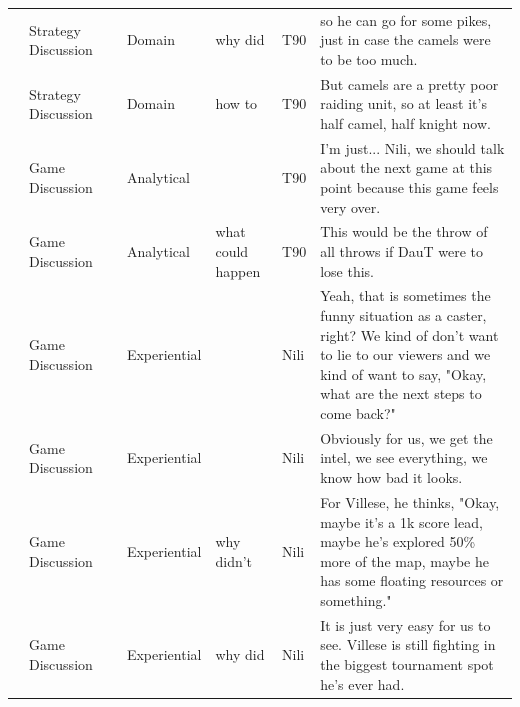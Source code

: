 {\begin{longtable}{@{}>{\theAppRow}r|L{2.3cm}L{2.2cm}L{1.4cm}L{2.2cm}L{0.5cm}U{5.6cm}@{}}
    & Strategy Discussion   &                      & Domain      & why did           & T90     & so he can go for some pikes, just in case the camels were to be too much.                                                                                                                                                \\
    & Strategy Discussion   &                      & Domain      & how to            & T90     & But camels are a pretty poor raiding unit, so at least it's half camel, half knight now.                                                                                                                                 \\
    & Game Discussion       &                      & Analytical  &                   & T90     & I'm just... Nili, we should talk about the next game at this point because this game feels very over.                                                                                                                    \\
    & Game Discussion       &                      & Analytical  & what could happen & T90     & This would be the throw of all throws if DauT were to lose this.                                                                                                                                                         \\
    & Game Discussion       &                      & Experiential &                   & Nili    & Yeah, that is sometimes the funny situation as a caster, right? We kind of don't want to lie to our viewers and we kind of want to say, "Okay, what are the next steps to come back?"                                    \\
    & Game Discussion       &                      & Experiential &                   & Nili    & Obviously for us, we get the intel, we see everything, we know how bad it looks.                                                                                                                                         \\
    & Game Discussion       &                      & Experiential & why didn't        & Nili    & For Villese, he thinks, "Okay, maybe it's a 1k score lead, maybe he's explored 50\% more of the map, maybe he has some floating resources or something."                                                                 \\
    & Game Discussion       &                      & Experiential & why did           & Nili    & It is just very easy for us to see. Villese is still fighting in the biggest tournament spot he's ever had.                                                                                                              \\

\end{longtable}}
